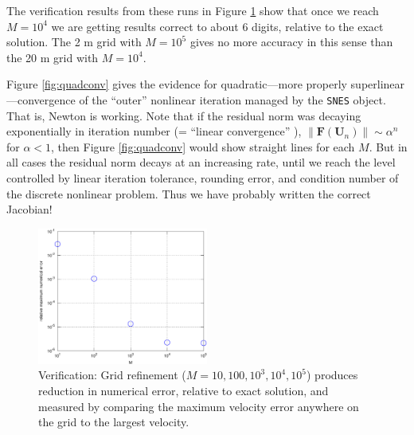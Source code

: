 \documentclass[11pt,final,reqno]{amsart}
\newcommand{\bbF}{\mathbf{F}}
\newcommand{\bU}{\mathbf{U}}
\begin{document}
The verification results from these runs in Figure \ref{fig:numerr} show that once we reach $M=10^4$ we are getting results correct to about 6 digits, relative to the exact solution.  The 2 m grid with $M=10^5$ gives no more accuracy in this sense than the 20 m grid with $M=10^4$.

Figure \ref{fig:quadconv} gives the evidence for quadratic---more properly superlinear---convergence of the ``outer'' nonlinear iteration managed by the \texttt{SNES} object.  That is, Newton is working.  Note that if the residual norm was decaying exponentially in iteration number (= ``linear convergence'' \cite{BurdenFaires}), $\|\bbF(\bU_n)\| \sim \alpha^n$ for $\alpha < 1$, then Figure \ref{fig:quadconv} would show straight lines for each $M$.  But in all cases the residual norm decays at an increasing rate, until we reach the level controlled by linear iteration tolerance, rounding error, and condition number of the discrete nonlinear problem.  Thus we have probably written the correct Jacobian!

\begin{figure}[ht] 
\begin{center}
\includegraphics[width=0.5\textwidth]{numerr}
\end{center}
\caption{Verification:  Grid refinement ($M=10,100,10^3,10^4,10^5$) produces reduction in numerical error, relative to exact solution, and measured by comparing the maximum velocity error anywhere on the grid to the largest velocity.}
\label{fig:numerr}
\end{figure}
\end{document}
